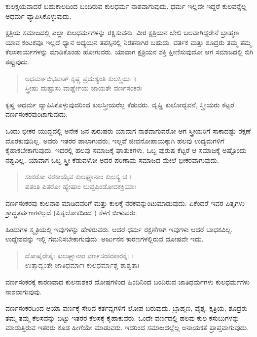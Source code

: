 {\small ಕುಲಕ್ಷಯವಾದರೆ ಬಹುಕಾಲದಿಂದ ಬಂದಿರುವ ಕುಲಧರ್ಮ ನಾಶವಾಗುವುದು. ಧರ್ಮ ಇಲ್ಲದೇ ಇದ್ದರೆ ಕುಲವನ್ನೆಲ್ಲ ಅಧರ್ಮ ವ್ಯಾಪಿಸಿಕೊಳ್ಳುವುದು.}

ಕ್ಷತ್ರಿಯ ಸಮಾಜದಲ್ಲಿ ಎಲ್ಲಾ ಕುಲಧರ್ಮಗಳನ್ನು ರಕ್ಷಿಸುವನು. ವೀರ ಕ್ಷತ್ರಿಯನ ಬೇಲಿ ಬಲವಾಗಿದ್ದರೇನೆ ಬ್ರಾಹ್ಮಣ ಯಾವ ಕಂಟಕವೂ ಇಲ್ಲದೆ ಧ್ಯಾನ ಅಧ್ಯಯನ ತಪಸ್ಸಿನಲ್ಲಿ ನಿರತನಾಗಿರ ಬಹುದು. ವರ್ತಕ ಮತ್ತು ಶೂದ್ರರು ತಮ್ಮ ತಮ್ಮ ಕೆಲಸಕಾರ್ಯಗಳನ್ನು ಮಾಡಿಕೊಂಡು ಹೋಗುವರು. ಯಾವಾಗ ಕ್ಷತ್ರಿಯನ ಶಕ್ತಿ ಕ್ಷೀಣಿಸುವುದೋ ಆಗ ಸಮಾಜದಲ್ಲಿ ಬಿಗಿ ತಪ್ಪುವುದು.

\begin{verse}
ಅಧರ್ಮಾಭಿಭವಾತ್ ಕೃಷ್ಣ ಪ್ರದುಶ್ಯಂತಿ ಕುಲಸ್ತ್ರಿಯಃ ।\\ಸ್ತ್ರೀಷು ದುಷ್ಟಾಸು ವಾರ್ಷ್ಣೇಯ ಜಾಯತೇ ವರ್ಣಸಂಕರಃ 
\end{verse}

{\small ಕೃಷ್ಣ ಅಧರ್ಮ ವ್ಯಾಪಿಸಿಕೊಳ್ಳುವುದರಿಂದ ಕುಲಸ್ತ್ರೀಯರೆಲ್ಲ ಕೆಡುವರು. ವೃಷ್ಣಿ ಕುಲೋದ್ಭವನೆ, ಸ್ತ್ರೀಯರು ಕೆಟ್ಟರೆ ವರ್ಣಸಂಕರವುಂಟಾಗುವುದು.}

ಒಂದು ಭೀಕರ ಯುದ್ಧದಲ್ಲಿ ಅನೇಕ ಜನ ಪುರುಷರು ಯಾವಾಗ ನಾಶವಾಗುವರೋ ಆಗ ಸ್ತ್ರೀಯರಿಗೆ ಸಾಕಾದಷ್ಟು ರಕ್ಷಣೆ ದೊರಕುವುದಿಲ್ಲ. ಅವರು ಇತರರ ಪಾಲಾಗುವರು; ಇಲ್ಲವೆ ಜೀವನೋಪಾಯಕ್ಕಾಗಿ ಹಲವು ಉದ್ಯಮಗಳಿಗೆ ಕೈಹಾಕಬೇಕಾಗುವುದು. ಇದರಲ್ಲಿ ಹಲವು ಸಮಾಜಕ್ಕೆ ಘಾತುಕಗಳು. ಒಬ್ಬ ಪುರುಷ ಕೆಟ್ಟರೆ ಆ ಸಮಾಜಕ್ಕೆ ಅಷ್ಟೊಂದು ನಷ್ಟವಿಲ್ಲ. ಯಾವಾಗ ಒಬ್ಬ ಸ್ತ್ರೀ ಕೆಡುವಳೋ ಅದರ ಪರಿಣಾಮ ಸಮಾಜದ ಮೇಲೆ ಭೀಕರವಾಗುವುದು.

\begin{verse}
ಸಂಕರೋ ನರಕಾಯೈವ ಕುಲಘ್ನಾನಾಂ ಕುಲಸ್ಯ ಚ ।\\ಪತಂತಿ ಪಿತರೋ ಹ್ಯೇಷಾಂ ಲುಪ್ತಪಿಂಡೋದಕಕ್ರಿಯಾಃ 
\end{verse}

{\small ವರ್ಣಸಂಕರವು ಕುಲನಾಶ ಮಾಡಿದವರಿಗೆ ಮತ್ತು ಕುಲಕ್ಕೆ ನರಕವನ್ನುಂಟುಮಾಡುವುದು. ಏಕೆಂದರೆ ಇವರ ಪಿತೃಗಳು ಶ್ರಾದ್ಧತರ್ಪಣಗಳಿಲ್ಲದೆ (ಪಿತೃಲೋಕದಿಂದ ) ಕೆಳಗೆ ಬೀಳುವರು.}

ಹಿಂದುಗಳ ಸ್ಮೃತಿಯಲ್ಲಿ ಇವುಗಳನ್ನು ಹೇಳಿರುವರು. ಆದರೆ ಧರ್ಮ ರಕ್ಷಣೆಗಾಗಿ ಇವುಗಳು ಆದರೆ ಬಾಧಕವಿಲ್ಲ. ಉದ್ದೇಶವನ್ನು ಇಲ್ಲಿ ಗಮನಿಸಬೇಕಾಗುವುದು. ಅರ್ಜುನನ ಕಾರಣಗಳಲ್ಲಿರುವ ದೋಷವೇ ಇದು.

\begin{verse}
ದೋಷೈರೇತೈಃ ಕುಲಘ್ನಾನಾಂ ವರ್ಣಸಂಕರಕಾರಕೈಃ ।\\ಉತ್ಸಾದ್ಯಂತೇ ಜಾತಿಧರ್ಮಾಃ ಕುಲಧರ್ಮಾಶ್ಚ ಶಾಶ್ವತಾಃ 
\end{verse}

{\small ವರ್ಣಸಂಕರಕ್ಕೆ ಕಾರಣವಾದ ಕುಲನಾಶಕರ ದೋಷಗಳಿಂದ ಹಿಂದಿನಿಂದ ಬಂದಿರುವ ಜಾತಿಧರ್ಮಗಳು ಕುಲಧರ್ಮಗಳು ನಾಶವಾಗುವುವು.}

ವರ್ಣಸಂಕರದಿಂದ ಆಯಾ ವರ್ಣಕ್ಕೆ ಸೇರಿದ ಕರ್ತವ್ಯಗಳಿಗೆ ಲೋಪ ಬರುವುದು. ಬ್ರಾಹ್ಮಣ, ವೈಶ್ಯ, ಕ್ಷತ್ರಿಯ, ಶೂದ್ರರು ತಮ್ಮ ತಮ್ಮ ಕೆಲಸವನ್ನು ಬಿಟ್ಟು ಇತರರ ಕೆಲಸಕ್ಕೆ ಕೈಹಾಕುವರು. ಒಂದೇ ವರ್ಣದಲ್ಲಿ ಹಲವು ಕುಲ ಕಸುಬುಗಳನ್ನು ಮಾಡುತ್ತಿರುವ ಇತರರು ಕೂಡ ಹೀಗೆಯೇ ಮಾಡುವರು. ಇದರಿಂದ ಸಮಾಜದಲ್ಲೆಲ್ಲ ಅನಾಯಕತೆ ಪ್ರಾಪ್ತವಾಗುವುದು.

